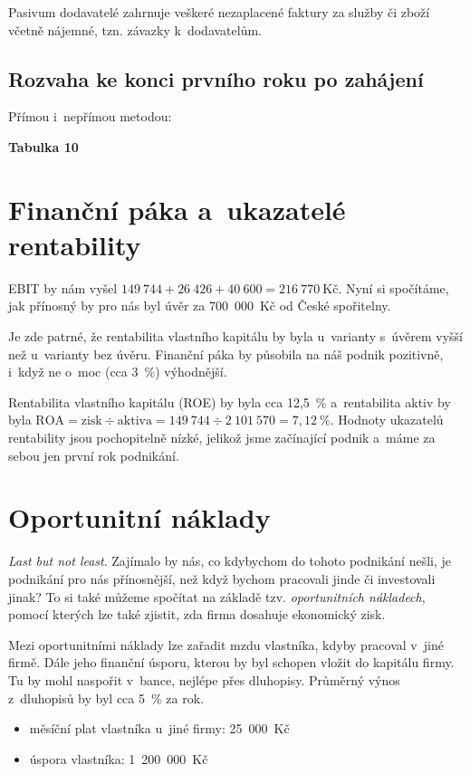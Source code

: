 Pasivum dodavatelé zahrnuje veškeré nezaplacené faktury za služby či zboží včetně nájemné, tzn. závazky k~dodavatelům.

\subsection{Rozvaha ke konci prvního roku po zahájení}
Přímou i~nepřímou metodou:

\textbf{Tabulka 10}




\section{Finanční páka a~ukazatelé rentability}
EBIT by nám vyšel $149~744 + 26~426 + 40~600 = 216~770~\text{Kč}$. Nyní si spočítáme, jak přínosný by pro nás byl úvěr za 700~000~Kč od České spořitelny.

Je zde patrné, že rentabilita vlastního kapitálu by byla u~varianty s~úvěrem vyšší než u~varianty bez úvěru. Finanční páka by působila na náš podnik pozitivně, i~když ne o~moc (cca 3~\%) výhodnější.

Rentabilita vlastního kapitálu (ROE) by byla cca 12,5~\% a~rentabilita aktiv by byla $ \text{ROA} = \text{zisk} \div \text{aktiva} = 149~744 \div 2~101~570 = 7,12~\%$. Hodnoty ukazatelů rentability jsou pochopitelně nízké, jelikož jsme začínající podnik a~máme za sebou jen první  rok podnikání.





\section{Oportunitní náklady}
\textit{Last but not least}. Zajímalo by nás, co kdybychom do tohoto podnikání nešli, je podnikání pro nás přínosnější, než když bychom pracovali jinde či investovali jinak? To si také můžeme spočítat na základě tzv. \textit{oportunitních nákladech}, pomocí kterých lze také zjistit, zda firma dosahuje ekonomický zisk.

Mezi oportunitními náklady lze zařadit mzdu vlastníka, kdyby pracoval v~jiné firmě. Dále jeho finanční úsporu, kterou by byl schopen vložit do kapitálu firmy. Tu by mohl naspořit v~bance, nejlépe přes dluhopisy. Průměrný výnos z~dluhopisů by byl cca 5~\% za rok.

\begin{itemize}
\item měsíční plat vlastníka u~jiné firmy: 25~000~Kč
\item úspora vlastníka: 1~200~000~Kč
\end{itemize}

